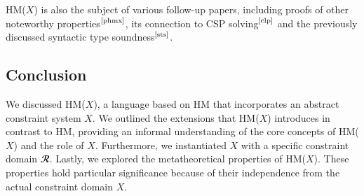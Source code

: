 \documentclass[runningheads]{llncs}
\newcommand{\hmx}{HM($X$)}
\begin{document}
\hmx{} is also the subject of various follow-up papers, including proofs of
other noteworthy properties$^\text{\cite{phmx}}$, its connection to CSP
solving$^\text{\cite{clp}}$ and the previously discussed syntactic type
soundness$^\text{\cite{sts}}$.

\subsection{Conclusion}
We discussed \hmx{}, a language based on HM that incorporates an abstract
constraint system $X$. We outlined the extensions that \hmx{} introduces in
contrast to HM, providing an informal understanding of the core concepts of
\hmx{} and the role of $X$. Furthermore, we instantiated $X$ with a specific
constraint domain $𝓡$.
Lastly, we explored the metatheoretical properties of \hmx{}.
These properties hold particular significance because of their independence
from the actual constraint domain $X$.

\nocite{atapl}
\printbibliography{}
\end{document}
